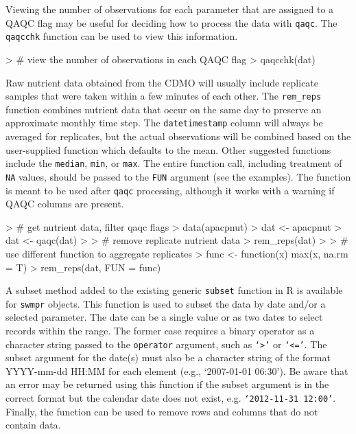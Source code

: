 Viewing the number of observations for each parameter that are assigned to a QAQC flag may be useful for deciding how to process the data with \texttt{qaqc}.  The \texttt{qaqcchk} function can be used to view this information.

\begin{example}
> # view the number of observations in each QAQC flag
> qaqcchk(dat)
\end{example}

Raw nutrient data obtained from the CDMO will usually include replicate samples that were taken within a few minutes of each other.  The \texttt{rem\_reps} function combines nutrient data that occur on the same day to preserve an approximate monthly time step.  The \texttt{datetimestamp} column will always be averaged for replicates, but the actual observations will be combined based on the user-supplied function which defaults to the mean.  Other suggested functions include the \texttt{median}, \texttt{min}, or \texttt{max}.  The entire function call, including treatment of \texttt{NA} values, should be passed to the \texttt{FUN} argument (see the examples).  The function is meant to be used after \texttt{qaqc} processing, although it works with a warning if QAQC columns are present.

\begin{example}
> # get nutrient data, filter qaqc flags
> data(apacpnut)
> dat <- apacpnut
> dat <- qaqc(dat)
> 
> # remove replicate nutrient data
> rem_reps(dat)
> 
> # use different function to aggregate replicates
> func <- function(x) max(x, na.rm = T)
> rem_reps(dat, FUN = func)
\end{example}

A subset method added to the existing generic \texttt{subset} function in R is available for \texttt{swmpr} objects.  This function is used to subset the data by date and/or a selected parameter.  The date can be a single value or as two dates to select records within the range. The former case requires a binary operator as a character string passed to the \texttt{operator} argument, such as \texttt{`>'} or \texttt{`<='}.  The subset argument for the date(s) must also be a character string of the format YYYY-mm-dd HH:MM for each element (e.g., `2007-01-01 06:30').  Be aware that an error may be returned using this function if the subset argument is in the correct format but the calendar date does not exist, e.g. \texttt{`2012-11-31 12:00'}.  Finally, the function can be used to remove rows and columns that do not contain data. 

